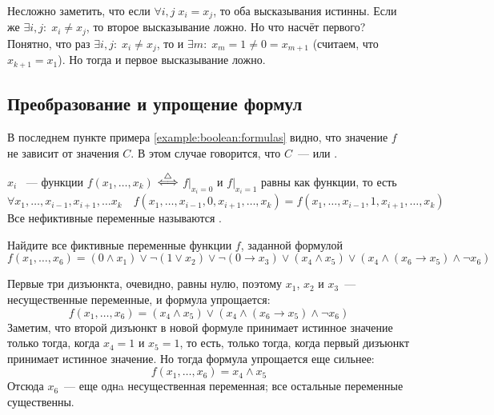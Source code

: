 \begin{Answer}
    \noindent
    Несложно заметить, что если $ \forall i, j \; x_i = x_j $, то оба высказывания истинны.
    Если же $ \exists i,j: \; x_i \neq x_j $, то второе высказывание ложно.
    Но что насчёт первого?
    Понятно, что раз $ \exists i,j: \; x_i \neq x_j $, то и $ \exists m: \; x_m = 1 \neq 0 = x_{m+1} $ (считаем, что $ x_{k+1} = x_1 $).
    Но тогда и первое высказывание ложно.
\end{Answer}



\subsection{Преобразование и упрощение формул}
\label{subsec:boolean:transformation}



В последнем пункте примера \ref{example:boolean:formulas} видно, что значение $ f $ не зависит от значения $ C $.
В этом случае говорится, что $ C $~---  или .

\begin{definition}
    $ x_i $ ~---  функции $ f(x_1, \ldots, x_k) $ $ \overset{\triangle}{\Longleftrightarrow} $ $ f \big|_{x_i = 0} $ и $ f \big|_{x_i = 1} $ равны как функции,
    то есть
    \[
        \forall x_1, \ldots, x_{i-1}, x_{i+1}, \ldots x_k \quad f(x_1, \ldots, x_{i-1}, 0, x_{i+1}, \ldots, x_k) = f(x_1, \ldots, x_{i-1}, 1, x_{i+1}, \ldots, x_k)
    \]
    Все нефиктивные переменные называются .
\end{definition}


\begin{Exercise}[counter=SecExercise, label={ex:boolean:insignificant_variables}]
    \noindent
    Найдите все фиктивные переменные функции $ f $, заданной формулой
    \[
        f(x_1, \ldots, x_6) = (0 \wedge x_1) \vee \neg (1 \vee x_2) \vee \neg (0 \rightarrow x_3) \vee (x_4 \wedge x_5) \vee (x_4 \wedge (x_6 \rightarrow x_5) \wedge \neg x_6)
    \]
\end{Exercise}

\begin{Answer}
    \noindent
    Первые три дизъюнкта, очевидно, равны нулю, поэтому $ x_1 $, $ x_2 $ и $ x_3 $~--- несущественные переменные, и формула упрощается:
    \[
        f(x_1, \ldots, x_6) = (x_4 \wedge x_5) \vee (x_4 \wedge (x_6 \rightarrow x_5) \wedge \neg x_6)
    \]
    Заметим, что второй дизъюнкт в новой формуле принимает истинное значение только тогда, когда $ x_4 = 1 $ и $ x_5 = 1 $,
    то есть, только тогда, когда первый дизъюнкт принимает истинное значение.
    Но тогда формула упрощается еще сильнее:
    \[
        f(x_1, \ldots, x_6) = x_4 \wedge x_5
    \]
    Отсюда $ x_6 $~--- еще однa несущественная переменная;
    все остальные переменные существенны.
\end{Answer}

